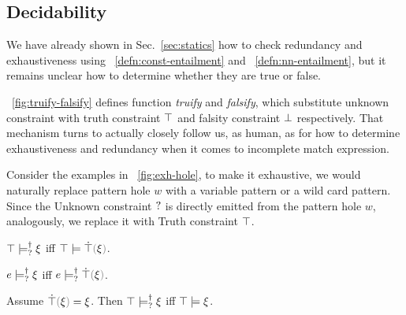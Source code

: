 \documentclass[runningheads,envcountsame,a4paper]{llncs}
\begin{document}
\subsection{Decidability}\label{sec:algorithm}

We have already shown in Sec.~\ref{sec:statics} how to check redundancy and
exhaustiveness using ~\ref{defn:const-entailment} and
~\ref{defn:nn-entailment}, but it remains unclear how to
determine whether they are true or false.



\figurename~\ref{fig:truify-falsify} defines function \textit{truify} and \textit{falsify},
which substitute unknown constraint with truth constraint $\top$ and falsity
constraint $\bot$ respectively. That mechanism turns to actually closely follow us, as human, as for how to determine exhaustiveness and redundancy when it comes to incomplete match expression.

Consider the examples in \figurename~\ref{fig:exh-hole}, to make it exhaustive, we would naturally replace pattern hole $w$ with a variable pattern or a wild card pattern. Since the Unknown constraint $\mathtt{?}$ is directly emitted from the pattern hole $w$, analogously, we replace it with Truth constraint $\top$.
\begin{theorem}
  $\top \models_{?}^{\dag} \xi$ iff $\csatisfy{\ctruth}{\ctruify{\xi}}$.
\end{theorem}

\begin{lemma}
  $e \models_{?}^{\dag} \xi$ iff $\csatisfyormay{e}{\ctruify{\xi}}$.
\end{lemma}

\begin{lemma}
  Assume $\ctruify{\xi}=\xi$. Then $\top \models_{?}^{\dag} \xi$ iff $\top \models \xi$.
\end{lemma}
\end{document}

